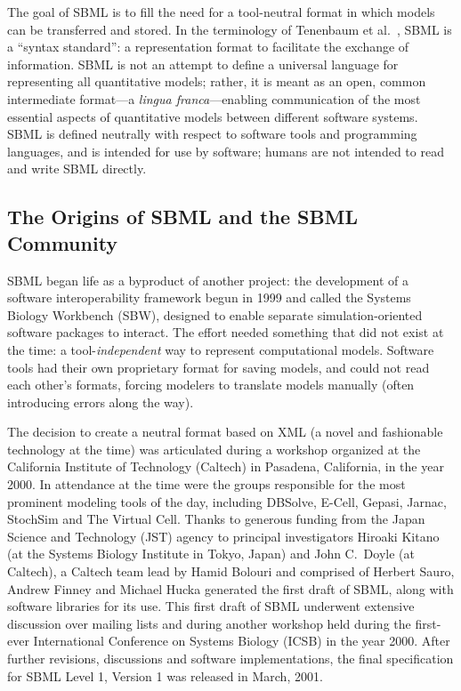 The goal of SBML is to fill the need for a tool-neutral format in which models can be transferred and stored.  In the terminology of Tenenbaum et al.~\cite{tenenbaum_2013}, SBML is a ``syntax standard'': a representation format to facilitate the exchange of information.  SBML is not an attempt to define a universal language for representing all quantitative models; rather, it is meant as an open, common intermediate format---a \emph{lingua franca}---enabling communication of the most essential aspects of quantitative models between different software systems.  SBML is defined neutrally with respect to software tools and programming languages, and is intended for use by software; humans are not intended to read and write SBML directly.


\subsection{The Origins of SBML and the SBML Community}

SBML began life as a byproduct of another project: the development of a software interoperability framework begun in 1999 and called the Systems Biology Workbench (SBW), designed to enable separate simulation-oriented software packages to interact.  The effort needed something that did not exist at the time: a tool-\emph{independent} way to represent computational models.  Software tools had their own proprietary format for saving models, and could not read each other's formats, forcing modelers to translate models manually (often introducing errors along the way).

The decision to create a neutral format based on XML (a novel and fashionable technology at the time) was articulated during a workshop organized at the California Institute of Technology (Caltech) in Pasadena, California, in the year 2000.  In attendance at the time were the groups responsible for the most prominent modeling tools of the day, including DBSolve, E-Cell, Gepasi, Jarnac, StochSim and The Virtual Cell.  Thanks to generous funding from the Japan Science and Technology (JST) agency to principal investigators Hiroaki Kitano (at the Systems Biology Institute in Tokyo, Japan) and John C.\ Doyle (at Caltech), a Caltech team lead by Hamid Bolouri and comprised of Herbert Sauro, Andrew Finney and Michael Hucka generated the first draft of SBML, along with software libraries for its use.  This first draft of SBML underwent extensive discussion over mailing lists and during another workshop held during the first-ever International Conference on Systems Biology (ICSB) in the year 2000.  After further revisions, discussions and software implementations, the final specification for SBML Level 1, Version 1 was released in March, 2001.

